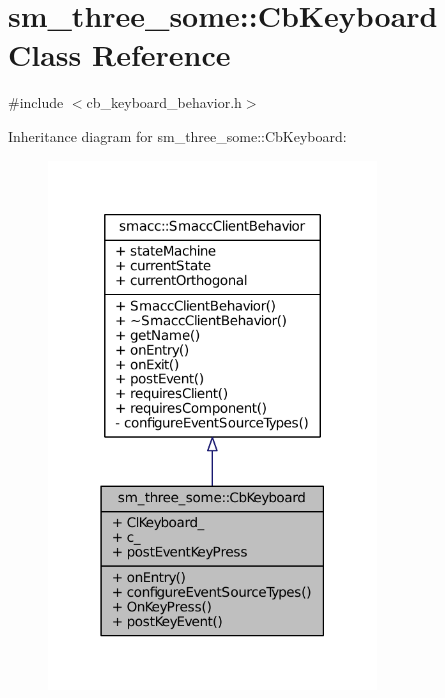 \hypertarget{classsm__three__some_1_1CbKeyboard}{}\section{sm\+\_\+three\+\_\+some\+:\+:Cb\+Keyboard Class Reference}
\label{classsm__three__some_1_1CbKeyboard}


{\ttfamily \#include $<$cb\+\_\+keyboard\+\_\+behavior.\+h$>$}



Inheritance diagram for sm\+\_\+three\+\_\+some\+:\+:Cb\+Keyboard\+:
\nopagebreak
\begin{figure}[H]
\begin{center}
\leavevmode
\includegraphics[width=247pt]{classsm__three__some_1_1CbKeyboard__inherit__graph}
\end{center}
\end{figure}


